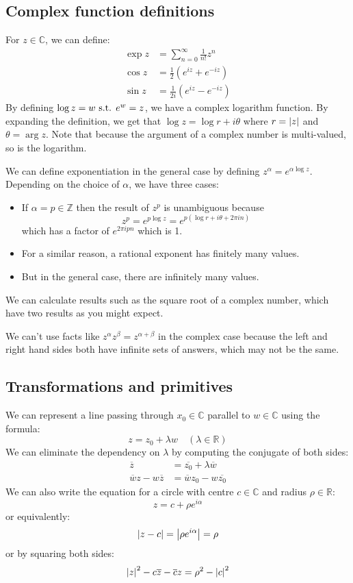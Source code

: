 \subsection{Complex function definitions}
For \(z \in \mathbb C\), we can define:
\begin{align*}
	\exp z & = \sum_{n=0}^{\infty} \frac{1}{n!}z^n          \\
	\cos z & = \frac{1}{2} \left( e^{iz} + e^{-iz} \right)  \\
	\sin z & = \frac{1}{2i} \left( e^{iz} - e^{-iz} \right)
\end{align*}
By defining \(\log z = w \text{ s.t. } e^w = z\), we have a complex logarithm function.
By expanding the definition, we get that \(\log z = \log r + i\theta\) where \(r = \abs{z}\) and \(\theta = \arg{z}\).
Note that because the argument of a complex number is multi-valued, so is the logarithm.

We can define exponentiation in the general case by defining \(z^\alpha = e^{\alpha \log z}\).
Depending on the choice of \(\alpha\), we have three cases:
\begin{itemize}
	\item If \(\alpha = p \in \mathbb Z\) then the result of \(z^p\) is unambiguous because
	      \[
		      z^p = e^{p \log z} = e^{p (\log r + i \theta + 2 \pi i n)}
	      \]
	      which has a factor of \(e^{2 \pi i p n}\) which is 1.
	\item For a similar reason, a rational exponent has finitely many values.
	\item But in the general case, there are infinitely many values.
\end{itemize}
We can calculate results such as the square root of a complex number, which have two results as you might expect.

\begin{note}
	We can't use facts like \(z^\alpha z^\beta = z^{\alpha + \beta}\) in the complex case because the left and right hand sides both have infinite sets of answers, which may not be the same.
\end{note}

\subsection{Transformations and primitives}
We can represent a line passing through \(x_0\in \mathbb C\) parallel to \(w \in \mathbb C\) using the formula:
\[
	z = z_0 + \lambda w\quad(\lambda \in \mathbb R)
\]
We can eliminate the dependency on \(\lambda\) by computing the conjugate of both sides:
\begin{align*}
	\overline{z}                  & = \overline{z_0} + \lambda \overline{w} \\
	\overline{w}z - w\overline{z} & = \overline{w}z_0 - w\overline{z_0}
\end{align*} %
We can also write the equation for a circle with centre \(c \in \mathbb C\) and radius \(\rho \in \mathbb R\):
\[
	z = c + \rho e^{i\alpha}
\]
or equivalently:
\[
	\abs{z - c} = \abs{\rho e^{i\alpha}} = \rho
\]
or by squaring both sides:
\[
	\abs{z}^2 - c\overline{z} - \overline{c}z = \rho^2 - \abs{c}^2
\]
